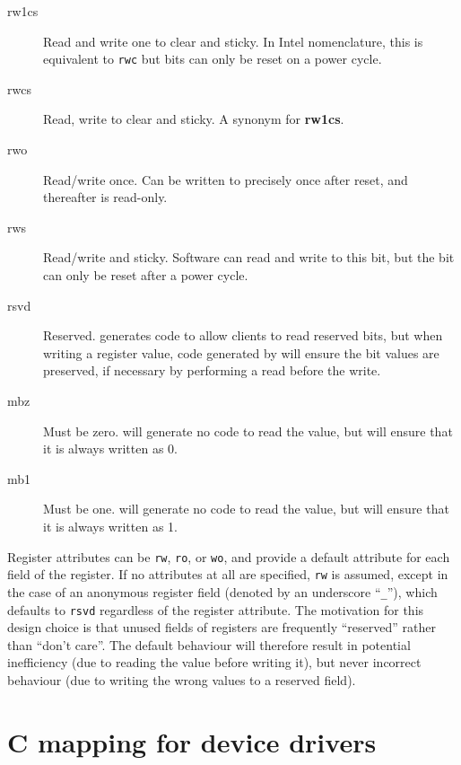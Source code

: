 \documentclass[a4paper,11pt,twoside]{report}
\begin{document}
\begin{description}
\item[rw1cs] Read and write one to clear and sticky.  In Intel
  nomenclature, this is equivalent to \texttt{rwc} but bits can only
  be reset on a power cycle.  

\item[rwcs] Read, write to clear and sticky.  A synonym for \textbf{rw1cs}.

\item[rwo] Read/write once. Can be written to precisely once after
  reset, and thereafter is read-only. 

\item[rws] Read/write and sticky.  Software can read and write to this
  bit, but the bit can only be reset after a power cycle. 

\item[rsvd] Reserved.  \Mac generates code to allow clients to read
  reserved bits, but when writing a register value, code generated by \Mac
  will ensure the bit values are preserved, if necessary by performing
  a read before the write. 

\item[mbz] Must be zero.  \Mac will generate no code to read the
  value, but will ensure that it is always written as 0. 

\item[mb1] Must be one.  \Mac will  generate no code to read the
  value, but will ensure that it is always written as 1. 

\end{description}

Register attributes can be \texttt{rw}, \texttt{ro}, or \texttt{wo},
and provide a default attribute for each field of the register.  If
no attributes at all are specified, \texttt{rw} is assumed, except in
the case of an anonymous register field (denoted by an underscore
``\texttt{\_}''), which defaults to 
\texttt{rsvd} regardless of the register attribute.  The motivation for
this design choice is that unused fields of registers are frequently
``reserved'' rather than ``don't care''.  The default behaviour will
therefore result in potential inefficiency (due to reading the value
before writing it), but never incorrect behaviour (due to writing the
wrong values to a reserved field).
 
\chapter{C mapping for device drivers}\label{chap:shiftdriver}
\end{document}
